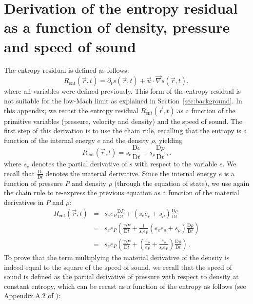 \documentclass[review,10pt]{elsarticle}
\newcommand{\grad}{\vec{\nabla}}
\newcommand{\resi}{R_\text{ent}}
\newcommand{\matder}[1]{\frac{\textrm{D} #1}{\textrm{D} t}}
\newcommand{\sct}[1]{Section~\ref{#1}}                   %
\begin{document}
\section{Derivation of the entropy residual as a function of density, pressure and speed of sound} \label{app:ent_res}

The entropy residual is defined as follows:
%
\begin{equation*}
\resi(\vec{r},t) = \partial_t s (\vec{r},t) + \vec{u} \cdot \grad s (\vec{r},t) ,
\end{equation*}
%
where all variables were defined previously. This form of the entropy residual is not suitable for the low-Mach 
limit as explained in \sct{sec:background}. In this appendix, we recast the entropy residual $\resi(\vec{r},t)$ 
as a function of the primitive variables (pressure, velocity and density) and the speed of sound. The first step 
of this derivation is to use the chain rule, recalling that the entropy is a function of the internal energy $e$ 
and the density $\rho$, yielding
%
\begin{equation*}
\resi(\vec{r},t) = s_e  \matder{e} + s_{\rho}  \matder{\rho} \,,.
\end{equation*}
%
where $s_e$ denotes the partial derivative of $s$ with respect to the variable $e$. We recall that $\matder{\ }$ 
denotes the material derivative. Since the internal energy $e$ is a function of pressure $P$ and density $\rho$ 
(through the equation of state), we use again the chain rule to re-express the previous equation as a function 
of the material derivatives in $P$ and $\rho$:
%
\begin{eqnarray*}
\resi(\vec{r},t) &=&  s_e e_P \matder{P} + ( s_e e_{\rho} + s_{\rho} ) \matder{\rho} \\
&=& s_e e_P \left( \matder{P} + \frac{1}{s_e e_P} ( s_e e_{\rho} + s_{\rho} )  \matder{\rho}\right) \\
&=& s_e e_P \left( \matder{P} + ( \frac{e_{\rho}}{e_P} + \frac{s_{\rho}}{s_e e_P} )  \matder{\rho} \right) \,.
\end{eqnarray*}
%
To prove that the term multiplying the material derivative of the density is indeed equal to the square of the speed 
of sound, we recall that the speed of sound is defined as the partial derivative of pressure with respect to density 
at constant entropy, which can be recast as a function of the entropy as follows (see Appendix A.2 of \cite{jlg}):
\end{document}
